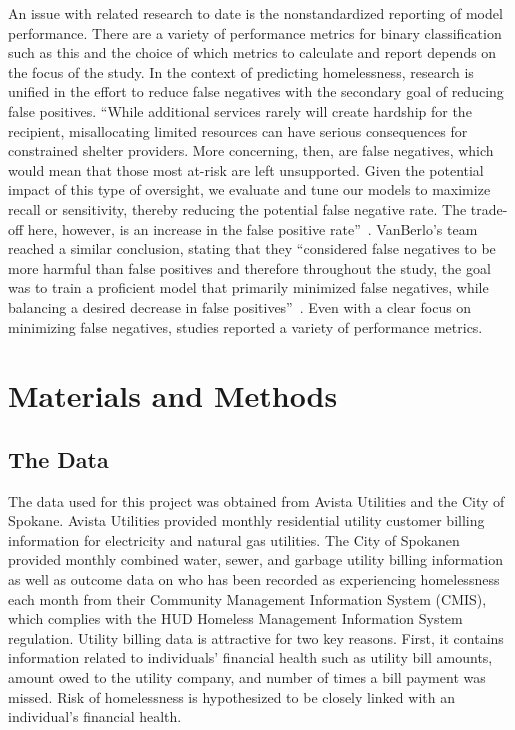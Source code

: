 \documentclass[10pt,letterpaper]{article}
\begin{document}
An issue with related research to date is the nonstandardized reporting of model performance. There are a variety of performance metrics for binary classification such as this and the choice of which metrics to calculate and report depends on the focus of the study. In the context of predicting homelessness, research is unified in the effort to reduce false negatives with the secondary goal of reducing false positives. ``While  additional  services  rarely  will  create  hardship  for the  recipient,  misallocating  limited  resources  can  have  serious  consequences for constrained shelter providers. More concerning, then, are false negatives, which  would  mean  that  those  most  at-risk  are  left  unsupported.  Given  the potential  impact  of  this  type  of  oversight,  we  evaluate  and  tune  our  models to maximize recall or sensitivity, thereby reducing the potential false negative rate.  The  trade-off  here,  however,  is  an increase  in  the  false  positive  rate''~\cite{hong2018applications}. VanBerlo's team reached a similar conclusion, stating that they ``considered false negatives to be more harmful than false positives and therefore throughout the study, the goal was to train a proficient model that primarily minimized false negatives, while balancing a desired decrease in false positives''~\cite{vanberlo2021interpretable}. Even with a clear focus on minimizing false negatives, studies reported a variety of performance metrics.

\section*{Materials and Methods}
\subsection*{The Data}
The data used for this project was obtained from Avista Utilities and the City of Spokane. Avista Utilities provided monthly residential utility customer billing information for electricity and natural gas utilities. The City of Spokanen provided monthly combined water, sewer, and garbage utility billing information as well as outcome data on who has been recorded as experiencing homelessness each month from their Community Management Information System (CMIS), which complies with the HUD Homeless Management Information System regulation. Utility billing data is attractive for two key reasons. First, it contains information related to individuals' financial health such as utility bill amounts, amount owed to the utility company, and number of times a bill payment was missed. Risk of homelessness is hypothesized to be closely linked with an individual's financial health.
\end{document}
